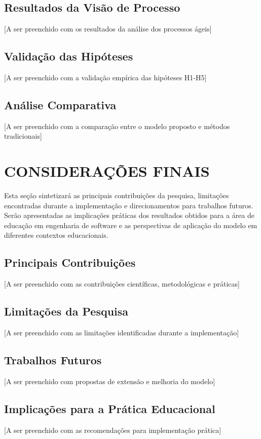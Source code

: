 \documentclass[12pt, a4paper, oneside]{abntex2}
\begin{document}
\subsection{Resultados da Visão de Processo}

[A ser preenchido com os resultados da análise dos processos ágeis]

\subsection{Validação das Hipóteses}

[A ser preenchido com a validação empírica das hipóteses H1-H5]

\subsection{Análise Comparativa}

[A ser preenchido com a comparação entre o modelo proposto e métodos tradicionais]

\section{CONSIDERAÇÕES FINAIS}

Esta seção sintetizará as principais contribuições da pesquisa, limitações encontradas durante a implementação e direcionamentos para trabalhos futuros. Serão apresentadas as implicações práticas dos resultados obtidos para a área de educação em engenharia de software e as perspectivas de aplicação do modelo em diferentes contextos educacionais.

\subsection{Principais Contribuições}

[A ser preenchido com as contribuições científicas, metodológicas e práticas]

\subsection{Limitações da Pesquisa}

[A ser preenchido com as limitações identificadas durante a implementação]

\subsection{Trabalhos Futuros}

[A ser preenchido com propostas de extensão e melhoria do modelo]

\subsection{Implicações para a Prática Educacional}

[A ser preenchido com as recomendações para implementação prática]

\postextual

\end{document}

